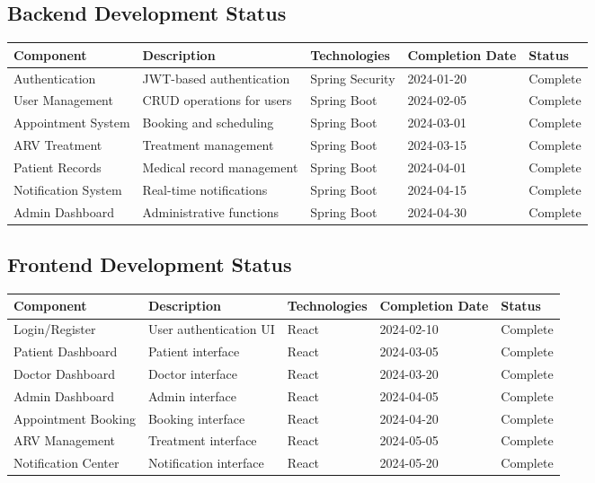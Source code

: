 \documentclass[12pt,a4paper]{article}
\begin{document}
\subsection{Backend Development Status}
\begin{longtable}{|p{3cm}|p{4cm}|p{3cm}|p{3cm}|p{2cm}|}
\hline
\rowcolor{lightgray}
\textbf{Component} & \textbf{Description} & \textbf{Technologies} & \textbf{Completion Date} & \textbf{Status} \\
\hline
Authentication & JWT-based authentication & Spring Security & 2024-01-20 & \cellcolor{completedgreen}Complete \\
\hline
User Management & CRUD operations for users & Spring Boot & 2024-02-05 & \cellcolor{completedgreen}Complete \\
\hline
Appointment System & Booking and scheduling & Spring Boot & 2024-03-01 & \cellcolor{completedgreen}Complete \\
\hline
ARV Treatment & Treatment management & Spring Boot & 2024-03-15 & \cellcolor{completedgreen}Complete \\
\hline
Patient Records & Medical record management & Spring Boot & 2024-04-01 & \cellcolor{completedgreen}Complete \\
\hline
Notification System & Real-time notifications & Spring Boot & 2024-04-15 & \cellcolor{completedgreen}Complete \\
\hline
Admin Dashboard & Administrative functions & Spring Boot & 2024-04-30 & \cellcolor{completedgreen}Complete \\
\hline
\end{longtable}

\subsection{Frontend Development Status}
\begin{longtable}{|p{3cm}|p{4cm}|p{3cm}|p{3cm}|p{2cm}|}
\hline
\rowcolor{lightgray}
\textbf{Component} & \textbf{Description} & \textbf{Technologies} & \textbf{Completion Date} & \textbf{Status} \\
\hline
Login/Register & User authentication UI & React & 2024-02-10 & \cellcolor{completedgreen}Complete \\
\hline
Patient Dashboard & Patient interface & React & 2024-03-05 & \cellcolor{completedgreen}Complete \\
\hline
Doctor Dashboard & Doctor interface & React & 2024-03-20 & \cellcolor{completedgreen}Complete \\
\hline
Admin Dashboard & Admin interface & React & 2024-04-05 & \cellcolor{completedgreen}Complete \\
\hline
Appointment Booking & Booking interface & React & 2024-04-20 & \cellcolor{completedgreen}Complete \\
\hline
ARV Management & Treatment interface & React & 2024-05-05 & \cellcolor{completedgreen}Complete \\
\hline
Notification Center & Notification interface & React & 2024-05-20 & \cellcolor{completedgreen}Complete \\
\hline
\end{longtable}
\end{document}
